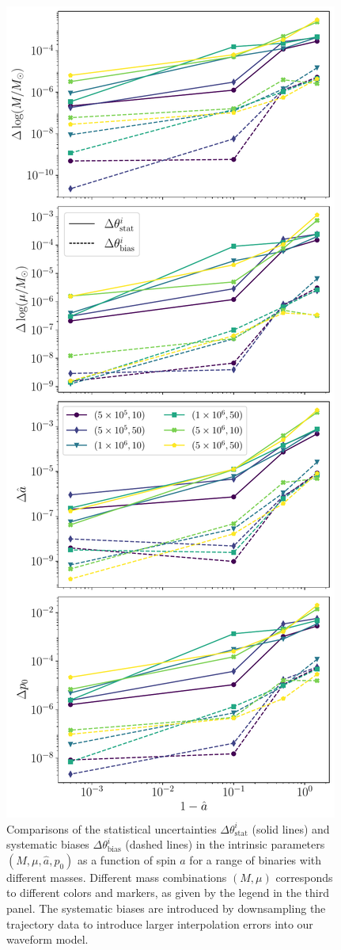 \documentclass[%
 reprint,
 nofootinbib,
 amsmath,amssymb,
 aps,
 prd,
]{revtex4-2}
\begin{document}
\begin{figure}[!htp]
    \centering
    \includegraphics[width=0.95\linewidth]{figures/phase_error.pdf}
    \caption{Comparisons of the statistical uncertainties $\Delta\theta^i_\mathrm{stat}$ (solid lines) and systematic biases $\Delta\theta^i_\mathrm{bias}$ (dashed lines) in the intrinsic parameters $(M,\mu,\hat{a},p_0)$ as a function of spin $\hat{a}$ for a range of binaries with different masses. Different mass combinations $(M,\mu)$ corresponds to different colors and markers, as given by the legend in the third panel. The systematic biases are introduced by downsampling the trajectory data to introduce larger interpolation errors into our waveform model.}
    \label{fig:fisherCompare}
\end{figure}
\end{document}
